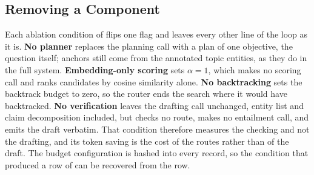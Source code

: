 \subsection{Removing a Component}\label{sec:removal}

Each ablation condition of  flips one flag and
leaves every other line of the loop as it is. \textbf{No planner}
replaces the planning call with a plan of one objective, the question
itself; anchors still come from the annotated topic entities, as they do
in the full system. \textbf{Embedding-only scoring} sets $\alpha = 1$,
which makes no scoring call and ranks candidates by cosine similarity
alone. \textbf{No backtracking} sets the backtrack budget to zero, so
the router ends the search where it would have backtracked. \textbf{No
verification} leaves the drafting call unchanged, entity list and claim
decomposition included, but checks no route, makes no entailment call,
and emits the draft verbatim. That condition therefore measures the
checking and not the drafting, and its token saving is the cost of the
routes rather than of the draft. The budget configuration is hashed into
every record, so the condition that produced a row of
 can be recovered from the row.
